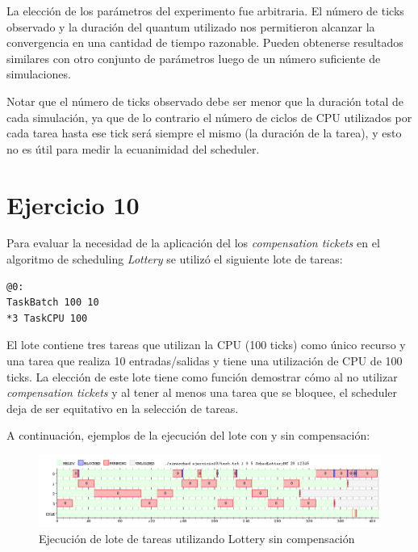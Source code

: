 \documentclass[a4paper,10pt,twoside]{article}
\begin{document}
La elección de los parámetros del experimento fue arbitraria. El número de ticks observado y la duración del quantum utilizado nos permitieron alcanzar la convergencia en una cantidad de tiempo razonable. Pueden obtenerse resultados similares con otro conjunto de parámetros luego de un número suficiente de simulaciones.

Notar que el número de ticks observado debe ser menor que la duración total de cada simulación, ya que de lo contrario el número de ciclos de CPU utilizados por cada tarea hasta ese tick será siempre el mismo (la duración de la tarea), y esto no es útil para medir la ecuanimidad del scheduler.



\section{Ejercicio 10}

Para evaluar la necesidad de la aplicación del los \textit{compensation tickets} en el algoritmo de scheduling \textit{Lottery} se utilizó el siguiente lote de tareas:
\begin{verbatim}
@0:
TaskBatch 100 10
*3 TaskCPU 100
\end{verbatim}
El lote contiene tres tareas que utilizan la CPU (100 ticks) como único recurso y una tarea que realiza 10 entradas/salidas y tiene una utilización de CPU de 100 ticks. La elección de este lote tiene como función demostrar cómo al no utilizar \textit{compensation tickets} y al tener al menos una tarea que se bloquee, el scheduler deja de ser equitativo en la selección de tareas.

A continuación, ejemplos de la ejecución del lote con y sin compensación:

\begin{figure}[H]
\centering
\includegraphics[width=175mm]{../ejercicio10/GraphSchedLotNC.png}
\caption{Ejecución de lote de tareas utilizando Lottery sin compensación}
\label{GraphSchedLotNC}
\end{figure}
\end{document}
